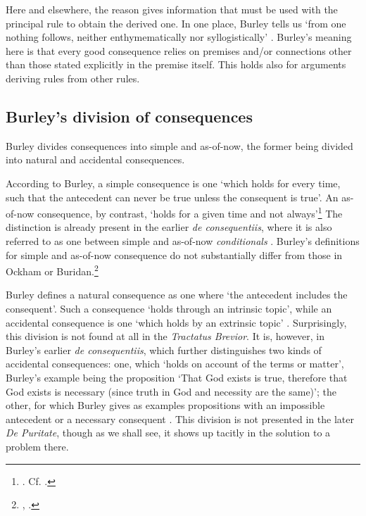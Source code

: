 \documentclass[]{birkjour}
\begin{document}
Here and elsewhere, the reason gives information that must be used with the principal rule to obtain the derived one. In one place, Burley tells us `from one nothing follows, neither enthymematically nor syllogistically' \autocite[p. 147, par. 130]{Green-Pedersen1980b}. Burley's meaning here is that every good consequence relies on premises and/or connections other than those stated explicitly in the premise itself. This holds also for arguments deriving rules from other rules. 

\subsection{Burley's division of consequences}
Burley divides consequences into simple and as-of-now, the former being divided into natural and accidental consequences. 

According to Burley, a simple consequence is one `which holds for every time, such that the antecedent can never be true unless the consequent is true'. An as-of-now consequence, by contrast, `holds for a given time and not always'\footnote{\autocite[pp. 60.29-61.5]{BurleyDPAL}. Cf. \autocite[p. 199.19-25]{BurleyDPAL}.} The distinction is already present in the earlier \textit{de consequentiis}, where it is also referred to as one between simple and as-of-now \textit{conditionals} \autocite[p. 128, par. 69]{Green-Pedersen1980b}. Burley's definitions for simple and as-of-now consequence do not substantially differ from those in Ockham or Buridan.\footnote{\autocite[III-3. 1, pp. 587-588]{OckhamSL}, \autocite[I. 4, p. 23]{BuridanTC}.}

Burley defines a natural consequence as one where `the antecedent includes the consequent'. Such a consequence `holds through an intrinsic topic', while an accidental consequence is one `which holds by an extrinsic topic' \autocite[p. 61.6-10]{BurleyDPAL}. Surprisingly, this division is not found at all in the \textit{Tractatus Brevior}. It is, however, in Burley's earlier \textit{de consequentiis}, which further distinguishes two kinds of accidental consequences: one, which `holds on account of the terms or matter', Burley's example being the proposition `That God exists is true, therefore that God exists is necessary (since truth in God and necessity are the same)'; the other, for which Burley gives as examples propositions with an impossible antecedent or a necessary consequent \autocite[pp. 128-129, par. 70]{Green-Pedersen1980b}. This division is not presented in the later \textit{De Puritate}, though as we shall see, it shows up tacitly in the solution to a problem there.
\end{document}
